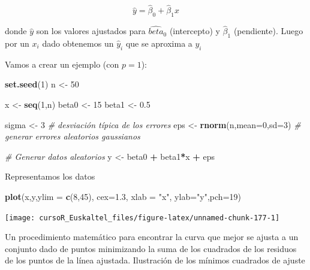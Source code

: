 \documentclass[]{book}
\newenvironment{Shaded}{\begin{snugshade}}{\end{snugshade}}
\newcommand{\KeywordTok}[1]{\textcolor[rgb]{0.13,0.29,0.53}{\textbf{#1}}}
\newcommand{\DataTypeTok}[1]{\textcolor[rgb]{0.13,0.29,0.53}{#1}}
\newcommand{\DecValTok}[1]{\textcolor[rgb]{0.00,0.00,0.81}{#1}}
\newcommand{\FloatTok}[1]{\textcolor[rgb]{0.00,0.00,0.81}{#1}}
\newcommand{\StringTok}[1]{\textcolor[rgb]{0.31,0.60,0.02}{#1}}
\newcommand{\CommentTok}[1]{\textcolor[rgb]{0.56,0.35,0.01}{\textit{#1}}}
\newcommand{\OperatorTok}[1]{\textcolor[rgb]{0.81,0.36,0.00}{\textbf{#1}}}
\newcommand{\NormalTok}[1]{#1}
\begin{document}
\[
         \hat{y} = \hat{\beta}_0 + \hat{\beta}_1 x
\]

donde \(\hat y\) son los valores ajustados para \(\hat{beta}_0\)
(intercepto) y \(\hat{\beta}_1\) (pendiente). Luego por un \(x_i\) dado
obtenemos un \(\hat{y}_i\) que se aproxima a \(y_i\)

Vamos a crear un ejemplo (con \(p=1\)):

\begin{Shaded}
\begin{Highlighting}[]
\KeywordTok{set.seed}\NormalTok{(}\DecValTok{1}\NormalTok{)}
\NormalTok{n <-}\StringTok{ }\DecValTok{50} 

\NormalTok{x <-}\StringTok{ }\KeywordTok{seq}\NormalTok{(}\DecValTok{1}\NormalTok{,n)}
\NormalTok{ beta0 <-}\StringTok{ }\DecValTok{15}
\NormalTok{ beta1 <-}\StringTok{ }\FloatTok{0.5}

\NormalTok{sigma <-}\StringTok{ }\DecValTok{3} \CommentTok{# desviación típica de los errores}
\NormalTok{eps <-}\StringTok{ }\KeywordTok{rnorm}\NormalTok{(n,}\DataTypeTok{mean=}\DecValTok{0}\NormalTok{,}\DataTypeTok{sd=}\DecValTok{3}\NormalTok{) }\CommentTok{# generar errores aleatorios gaussianos}

\CommentTok{# Generar datos aleatorios}
\NormalTok{ y <-}\StringTok{ }\NormalTok{beta0 }\OperatorTok{+}\StringTok{ }\NormalTok{beta1}\OperatorTok{*}\NormalTok{x  }\OperatorTok{+}\StringTok{  }\NormalTok{eps}
\end{Highlighting}
\end{Shaded}

Representamos los datos

\begin{Shaded}
\begin{Highlighting}[]
\KeywordTok{plot}\NormalTok{(x,y,}\DataTypeTok{ylim =} \KeywordTok{c}\NormalTok{(}\DecValTok{8}\NormalTok{,}\DecValTok{45}\NormalTok{), }\DataTypeTok{cex=}\FloatTok{1.3}\NormalTok{, }\DataTypeTok{xlab =} \StringTok{"x"}\NormalTok{, }\DataTypeTok{ylab=}\StringTok{"y"}\NormalTok{,}\DataTypeTok{pch=}\DecValTok{19}\NormalTok{)}
\end{Highlighting}
\end{Shaded}

\begin{center}\texttt{[image: cursoR\_Euskaltel\_files/figure-latex/unnamed-chunk-177-1]} \end{center}

Un procedimiento matemático para encontrar la curva que mejor se ajusta
a un conjunto dado de puntos minimizando la suma de los cuadrados de los
residuos de los puntos de la línea ajustada. Ilustración de los mínimos
cuadrados de ajuste
\end{document}
